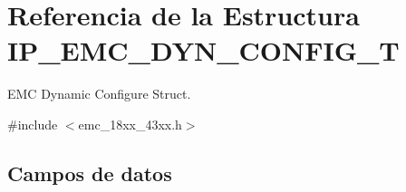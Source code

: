 \hypertarget{struct_i_p___e_m_c___d_y_n___c_o_n_f_i_g___t}{}\section{Referencia de la Estructura I\+P\+\_\+\+E\+M\+C\+\_\+\+D\+Y\+N\+\_\+\+C\+O\+N\+F\+I\+G\+\_\+T}
\label{struct_i_p___e_m_c___d_y_n___c_o_n_f_i_g___t}


E\+MC Dynamic Configure Struct.  




{\ttfamily \#include $<$emc\+\_\+18xx\+\_\+43xx.\+h$>$}

\subsection*{Campos de datos}
